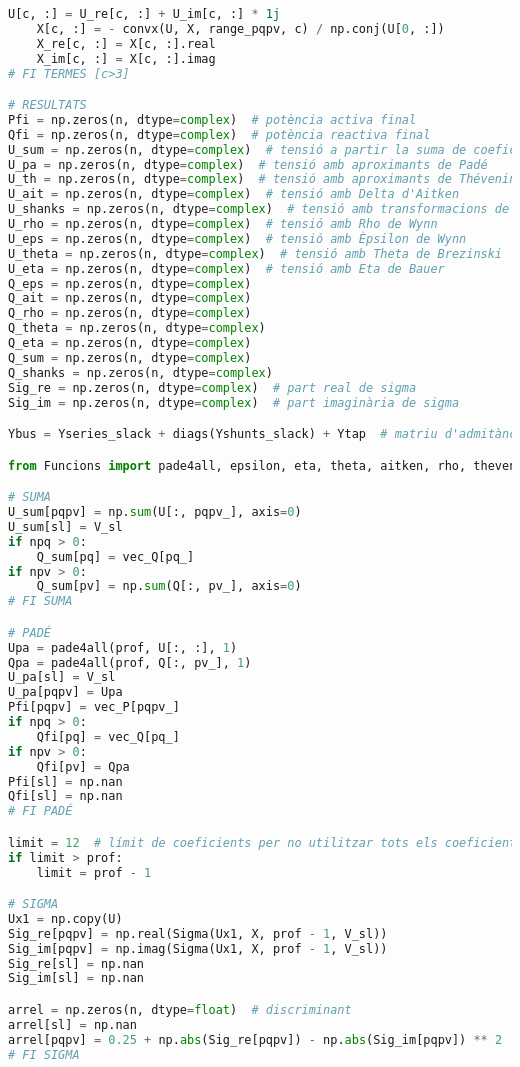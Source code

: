 \begin{lstlisting}[language=Python,numbers=none]
    U[c, :] = U_re[c, :] + U_im[c, :] * 1j
    X[c, :] = - convx(U, X, range_pqpv, c) / np.conj(U[0, :])
    X_re[c, :] = X[c, :].real
    X_im[c, :] = X[c, :].imag
# FI TERMES [c>3]

# RESULTATS
Pfi = np.zeros(n, dtype=complex)  # potència activa final
Qfi = np.zeros(n, dtype=complex)  # potència reactiva final
U_sum = np.zeros(n, dtype=complex)  # tensió a partir la suma de coeficients
U_pa = np.zeros(n, dtype=complex)  # tensió amb aproximants de Padé
U_th = np.zeros(n, dtype=complex)  # tensió amb aproximants de Thévenin
U_ait = np.zeros(n, dtype=complex)  # tensió amb Delta d'Aitken
U_shanks = np.zeros(n, dtype=complex)  # tensió amb transformacions de Shanks
U_rho = np.zeros(n, dtype=complex)  # tensió amb Rho de Wynn
U_eps = np.zeros(n, dtype=complex)  # tensió amb Èpsilon de Wynn
U_theta = np.zeros(n, dtype=complex)  # tensió amb Theta de Brezinski
U_eta = np.zeros(n, dtype=complex)  # tensió amb Eta de Bauer
Q_eps = np.zeros(n, dtype=complex)
Q_ait = np.zeros(n, dtype=complex)
Q_rho = np.zeros(n, dtype=complex)
Q_theta = np.zeros(n, dtype=complex)
Q_eta = np.zeros(n, dtype=complex)
Q_sum = np.zeros(n, dtype=complex)
Q_shanks = np.zeros(n, dtype=complex)
Sig_re = np.zeros(n, dtype=complex)  # part real de sigma
Sig_im = np.zeros(n, dtype=complex)  # part imaginària de sigma

Ybus = Yseries_slack + diags(Yshunts_slack) + Ytap  # matriu d'admitàncies total

from Funcions import pade4all, epsilon, eta, theta, aitken, rho, thevenin, Sigma, shanks  # importar funcions

# SUMA
U_sum[pqpv] = np.sum(U[:, pqpv_], axis=0)
U_sum[sl] = V_sl
if npq > 0:
    Q_sum[pq] = vec_Q[pq_]
if npv > 0:
    Q_sum[pv] = np.sum(Q[:, pv_], axis=0)
# FI SUMA

# PADÉ
Upa = pade4all(prof, U[:, :], 1)
Qpa = pade4all(prof, Q[:, pv_], 1)
U_pa[sl] = V_sl
U_pa[pqpv] = Upa
Pfi[pqpv] = vec_P[pqpv_]
if npq > 0:
    Qfi[pq] = vec_Q[pq_]
if npv > 0:
    Qfi[pv] = Qpa
Pfi[sl] = np.nan
Qfi[sl] = np.nan
# FI PADÉ

limit = 12  # límit de coeficients per no utilitzar tots els coeficients
if limit > prof:
    limit = prof - 1

# SIGMA
Ux1 = np.copy(U)
Sig_re[pqpv] = np.real(Sigma(Ux1, X, prof - 1, V_sl))
Sig_im[pqpv] = np.imag(Sigma(Ux1, X, prof - 1, V_sl))
Sig_re[sl] = np.nan
Sig_im[sl] = np.nan

arrel = np.zeros(n, dtype=float)  # discriminant
arrel[sl] = np.nan
arrel[pqpv] = 0.25 + np.abs(Sig_re[pqpv]) - np.abs(Sig_im[pqpv]) ** 2
# FI SIGMA


\end{lstlisting}
